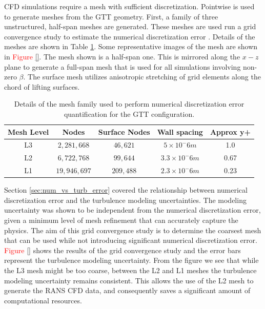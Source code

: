 CFD simulations require a mesh with sufficient discretization.
Pointwise is used to generate meshes from the GTT geometry. 
First, a family of three unstructured, half-span meshes are generated.
These meshes are used run a grid convergence study to estimate the numerical discretization error \cite{american_society_of_mechanical_engineers_standard_2009}. 
Details of the meshes are shown in Table \ref{tab:gtt_meshes}.
Some representative images of the mesh are shown in \textcolor{red}{Figure \ref{}}.
The mesh shown is a half-span one.
This is mirrored along the $x-z$ plane to generate a full-span mesh that is used for all simulations involving non-zero $\beta$.
The surface mesh utilizes anisotropic stretching of grid elements along the chord of lifting surfaces. 

\begin{table}
    \renewcommand{\arraystretch}{1.2}
    \centering
    \begin{tabular}{ c|c|c|c|c } 
         Mesh Level & Nodes & Surface Nodes & Wall spacing & Approx y+  \\ 
         \hline
         L3 & $2,281,668$ & $46,621$ & $5\times10^-6 m$ & 1.0 \\
         L2 & $6,722,768$ & $99,644$ & $3.3\times10^-6 m$ & 0.67 \\
         L1 & $19,946,697$ & $209,488$ & $2.3\times10^-6 m$ & 0.23 \\
         
    \end{tabular}
    \caption{Details of the mesh family used to perform numerical discretization error quantification for the GTT configuration.}
    \label{tab:gtt_meshes}
\end{table}

Section \ref{sec:num_vs_turb_error} covered the relationship between numerical discretization error and the turbulence modeling uncertainties. 
The modeling uncertainty was shown to be independent from the numerical discretization error, given a minimum level of mesh refinement that can accurately capture the physics. 
The aim of this grid convergence study is to determine the coarsest mesh that can be used while not introducing significant numerical discretization error. 
\textcolor{red}{Figure \ref{}} shows the results of the grid convergence study and the error bars represent the turbulence modeling uncertainty. 
From the figure we see that while the L3 mesh might be too coarse, between the L2 and L1 meshes the turbulence modeling uncertainty remains consistent. 
This allows the use of the L2 mesh to generate the RANS CFD data, and consequently saves a significant amount of computational resources. 

